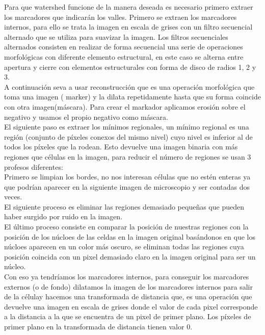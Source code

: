 \documentclass[a4paper,12pt]{report}
\begin{document}
Para que watershed funcione de la manera deseada es necesario primero extraer los marcadores que indicarán los valles. Primero se extraen los marcadores internos, para ello se trata la imagen en escala de grises con un filtro secuencial alternado que se utiliza para suavizar la imagen. Los filtros secuenciales alternados consisten en realizar de forma secuencial una serie de operaciones morfológicas con diferente elemento estructural, en este caso se alterna entre apertura y cierre con elementos estructurales con forma de disco de radios 1, 2 y 3.\\

A continuación seva a usar reconstrucción que es una operación morfológica que toma una imagen ( marker) y la dilata repetidamente hasta que su forma coincide con otra imagen(máscara). Para crear el markador aplicamos erosión sobre el negativo y usamos el propio negativo como máscara.\\ 

El siguiente paso es extraer los mínimos regionales, un mínimo regional es una región (conjunto de píxeles conexos del mismo nivel) cuyo nivel es inferior al de todos los píxeles que la rodean. Esto devuelve una imagen binaria con más regiones que células en la imagen, para reducir el número de regiones se usan 3 profesos diferentes:\\

Primero se limpian los bordes, no nos interesan células que no estén enteras ya que podrían aparecer en la siguiente imagen de microscopio y ser contadas dos veces.\\

El siguiente proceso es eliminar las regiones demasiado pequeñas que pueden haber surgido por ruido en la imagen.\\

El último proceso consiste en comparar la posición de nuestras regiones con la posición de los núcloes de las celdas en la imagen original basándonos en que los núcloes aparecen en un color más oscuro, se eliminan todas las regiones cuya posición coincida con un pixel demasiado claro en la imagen original para ser un núcleo.\\

Con eso ya tendríamos los marcadores internos, para conseguir los marcadores externos (o de fondo) dilatamos la imagen de los marcadores internos para salir de la célulay hacemos una transformada de distancia que, es una operación que devuelve una imagen en escala de grises donde el valor de cada pixel corresponde a la distancia a la que se encuentra de un pixel de primer plano. Los píxeles de primer plano en la transformada de distancia tienen valor 0.\\
\end{document}
